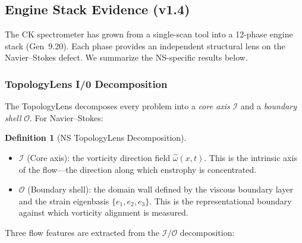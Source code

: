 \documentclass[11pt]{article}
\theoremstyle{definition}
\newtheorem{definition}[theorem]{Definition}
\theoremstyle{remark}
\begin{document}
\subsection{Engine Stack Evidence (v1.4)}
\label{sec:engine-evidence}

The CK spectrometer has grown from a single-scan tool into a 12-phase engine
stack (Gen~9.20).  Each phase provides an independent structural lens on the
Navier--Stokes defect.  We summarize the NS-specific results below.

\subsubsection{TopologyLens I/0 Decomposition}
\label{sec:topology-lens}

The TopologyLens decomposes every problem into a \emph{core axis} $\mathcal{I}$
and a \emph{boundary shell} $\mathcal{O}$.  For Navier--Stokes:

\begin{definition}[NS TopologyLens Decomposition]
\label{def:ns-topology-lens}
\mbox{}
\begin{itemize}[nosep]
  \item $\mathcal{I}$ (Core axis): the vorticity direction field $\hat\omega(x,t)$.
    This is the intrinsic axis of the flow---the direction along which enstrophy
    is concentrated.
  \item $\mathcal{O}$ (Boundary shell): the domain wall defined by the viscous
    boundary layer and the strain eigenbasis $\{e_1, e_2, e_3\}$.
    This is the representational boundary against which vorticity alignment
    is measured.
\end{itemize}
\end{definition}

Three flow features are extracted from the $\mathcal{I}/\mathcal{O}$ decomposition:
\end{document}
